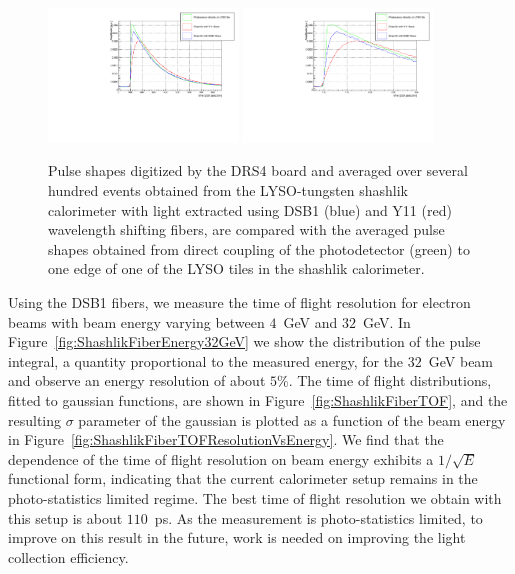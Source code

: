 \documentclass[12pt]{article}
\begin{document}
\begin{figure}[h] \centering
\includegraphics[width=0.45\textwidth]{figs/FiberPulses} 
\includegraphics[width=0.45\textwidth]{figs/FiberPulsesZoom} 
\caption{ Pulse shapes digitized by the DRS4 board and averaged over several hundred events 
obtained from the LYSO-tungsten shashlik calorimeter with light extracted using
DSB1 (blue) and Y11 (red) wavelength shifting fibers, are compared with 
the averaged pulse shapes obtained from direct coupling of the photodetector (green)
to one edge of one of the LYSO tiles in the shashlik calorimeter.} 
\label{fig:FiberPulseComparison}
\end{figure}


Using the DSB1 fibers, we measure the time of flight resolution
for electron beams with beam energy varying between $4$~GeV and $32$~GeV.
In Figure~\ref{fig:ShashlikFiberEnergy32GeV} we show the distribution
of the pulse integral, a quantity proportional to the measured energy,
for the $32$~GeV beam and observe an energy resolution of about $5\%$.
The time of flight distributions, fitted to gaussian functions,
are shown in Figure~\ref{fig:ShashlikFiberTOF}, and the resulting
$\sigma$ parameter of the gaussian is plotted as a function of the
beam energy in Figure~\ref{fig:ShashlikFiberTOFResolutionVsEnergy}.
We find that the dependence of the time of flight resolution on
beam energy exhibits a $1/\sqrt{E}$ functional form, indicating
that the current calorimeter setup remains in the photo-statistics
limited regime. The best time of flight resolution we obtain
with this setup is about $110$~ps. As the measurement is photo-statistics
limited, to improve on this result in the future, work is needed
on improving the light collection efficiency. 
\end{document}

